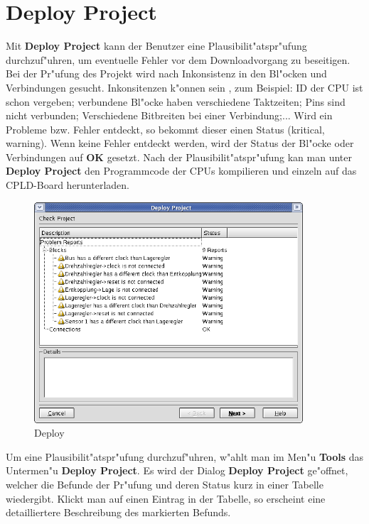 \documentclass[a4paper,titlepage,12pt,ngerman]{scrbook}
\begin{document}
\section{Deploy Project}
Mit {\bf Deploy Project} kann der Benutzer eine Plausibilit"atspr"ufung durchzuf"uhren, um eventuelle Fehler vor dem Downloadvorgang zu beseitigen. Bei der Pr"ufung des Projekt wird nach Inkonsistenz in den Bl"ocken und Verbindungen gesucht. Inkonsitenzen k"onnen sein , zum Beispiel: ID der CPU ist schon vergeben; verbundene Bl"ocke haben verschiedene Taktzeiten; Pins sind nicht verbunden; Verschiedene Bitbreiten bei einer Verbindung;... Wird ein Probleme bzw. Fehler entdeckt, so bekommt dieser einen Status (kritical, warning). Wenn keine Fehler entdeckt werden, wird der Status der Bl"ocke oder Verbindungen auf {\bf OK} gesetzt.\newline
Nach der Plausibilit"atspr"ufung kan man unter {\bf Deploy Project} den Programmcode der CPUs kompilieren und einzeln auf das CPLD-Board herunterladen.
\begin{figure}[htbp]

\begin{center}

\includegraphics[width=10cm]{Deploy}

\caption{Deploy}\label{test}

\end{center}
\end{figure}
Um eine Plausibilit"atspr"ufung durchzuf"uhren, w"ahlt man im Men"u {\bf Tools} das Untermen"u {\bf Deploy Project}. Es wird der Dialog {\bf Deploy Project} ge"offnet, welcher die Befunde der Pr"ufung und deren Status kurz in einer Tabelle wiedergibt. Klickt man auf einen Eintrag in der Tabelle, so erscheint eine detailliertere Beschreibung des markierten Befunds.\par
\end{document}
